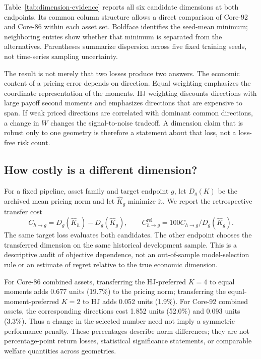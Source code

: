 Table~\ref{tab:dimension-evidence} reports all six candidate dimensions at both endpoints. Its common column structure allows a direct comparison of Core-92 and Core-86 within each asset set. Boldface identifies the seed-mean minimum; neighboring entries show whether that minimum is separated from the alternatives. Parentheses summarize dispersion across five fixed training seeds, not time-series sampling uncertainty.



The result is not merely that two losses produce two answers. The economic content of a pricing error depends on direction. Equal weighting emphasizes the coordinate representation of the moments. HJ weighting discounts directions with large payoff second moments and emphasizes directions that are expensive to span. If weak priced directions are correlated with dominant common directions, a change in $W$ changes the signal-to-noise tradeoff. A dimension claim that is robust only to one geometry is therefore a statement about that loss, not a loss-free risk count.

\subsection{How costly is a different dimension?}
For a fixed pipeline, asset family and target endpoint $g$, let $D_g(K)$ be the archived mean pricing norm and let $\widehat K_g$ minimize it. We report the retrospective transfer cost
\begin{equation}
 C_{h\to g}=D_g(\widehat K_h)-D_g(\widehat K_g),\qquad
 C_{h\to g}^{\mathrm{rel}}=100 C_{h\to g}/D_g(\widehat K_g).
\end{equation}
The same target loss evaluates both candidates. The other endpoint chooses the transferred dimension on the same historical development sample. This is a descriptive audit of objective dependence, not an out-of-sample model-selection rule or an estimate of regret relative to the true economic dimension.



For Core-86 combined assets, transferring the HJ-preferred $K=4$ to equal moments adds 0.677 units (19.7\%) to the pricing norm; transferring the equal-moment-preferred $K=2$ to HJ adds 0.052 units (1.9\%). For Core-92 combined assets, the corresponding directions cost 1.852 units (52.0\%) and 0.093 units (3.3\%). Thus a change in the selected number need not imply a symmetric performance penalty. These percentages describe norm differences; they are not percentage-point return losses, statistical significance statements, or comparable welfare quantities across geometries.

